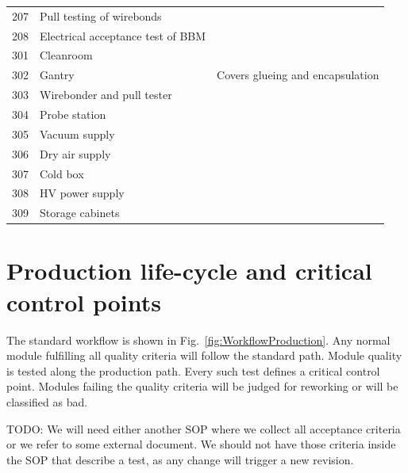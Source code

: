\documentclass[12pt]{unlsilabsop}
\begin{document}
\begin{table}[hH]
\begin{center}
{\begin{tabular}{lp{7cm}p{6cm}}
207 & Pull testing of wirebonds & \\
208 & Electrical acceptance test of BBM & \\
\midrule
301 & Cleanroom & \\
302 & Gantry & Covers glueing and encapsulation \\
303 & Wirebonder and pull tester & \\
304 & Probe station & \\
305 & Vacuum supply & \\
306 & Dry air supply & \\
307 & Cold box & \\
308 & HV power supply & \\
309 & Storage cabinets & \\
\bottomrule
\end{tabular}
}
\end{center}
\end{table}

\section{Production life-cycle and critical control points}

The standard workflow is shown in Fig.~\ref{fig:WorkflowProduction}. Any normal module fulfilling all quality criteria will follow the standard path. Module quality is tested along the production path. Every such test defines a critical control point. Modules failing the quality criteria will be judged for reworking or will be classified as bad.

TODO: We will need either another SOP where we collect all acceptance criteria or we refer to some external document. We should not have those criteria inside the SOP that describe a test, as any change will trigger a new revision.
\end{document}

